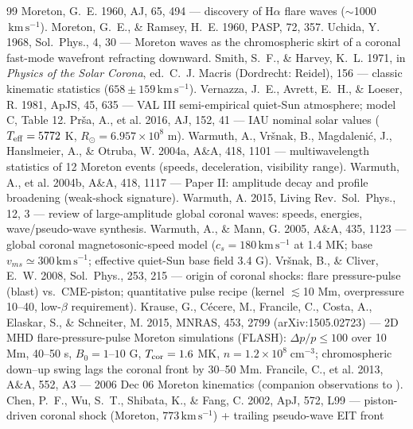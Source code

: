 \documentclass[11pt,a4paper]{article}
\newcommand{\Rsun}{R_\odot}
\newcommand{\kms}{\,\mathrm{km\,s^{-1}}}
\begin{document}
\begin{thebibliography}{99}\itemsep1pt\small
{} Moreton, G.~E. 1960, AJ, 65, 494 --- discovery of H$\alpha$ flare
waves ($\sim$1000$\kms$).
 Moreton, G.~E., \& Ramsey, H.~E. 1960, PASP, 72, 357.
 Uchida, Y. 1968, Sol.~Phys., 4, 30 --- Moreton waves as the
chromospheric skirt of a coronal fast-mode wavefront refracting downward.
 Smith, S.~F., \& Harvey, K.~L. 1971, in \emph{Physics of the
Solar Corona}, ed.\ C.~J. Macris (Dordrecht: Reidel), 156 --- classic kinematic
statistics ($658\pm159\kms$).
 Vernazza, J.~E., Avrett, E.~H., \& Loeser, R. 1981, ApJS, 45, 635 ---
VAL III semi-empirical quiet-Sun atmosphere; model C, Table 12.
 Pr\v{s}a, A., et al. 2016, AJ, 152, 41 --- IAU nominal solar values
($T_{\rm eff}=5772$ K, $\Rsun=6.957\times10^8$ m).
 Warmuth, A., Vr\v{s}nak, B., Magdaleni\'c, J., Hanslmeier, A., \&
Otruba, W. 2004a, A\&A, 418, 1101 --- multiwavelength statistics of 12 Moreton events
(speeds, deceleration, visibility range).
 Warmuth, A., et al. 2004b, A\&A, 418, 1117 --- Paper II:
amplitude decay and profile broadening (weak-shock signature).
 Warmuth, A. 2015, Living Rev.~Sol.~Phys., 12, 3 --- review of
large-amplitude global coronal waves: speeds, energies, wave/pseudo-wave synthesis.
 Warmuth, A., \& Mann, G. 2005, A\&A, 435, 1123 --- global
coronal magnetosonic-speed model ($c_s=180\kms$ at 1.4 MK; base $v_{ms}\simeq300\kms$;
effective quiet-Sun base field 3.4 G).
 Vr\v{s}nak, B., \& Cliver, E.~W. 2008, Sol.~Phys., 253, 215 ---
origin of coronal shocks: flare pressure-pulse (blast) vs.\ CME-piston; quantitative
pulse recipe (kernel $\lesssim$10 Mm, overpressure 10--40, low-$\beta$ requirement).
 Krause, G., C\'ecere, M., Francile, C., Costa, A., Elaskar, S., \&
Schneiter, M. 2015, MNRAS, 453, 2799 (arXiv:1505.02723) --- 2D MHD flare-pressure-pulse
Moreton simulations (FLASH): $\Delta p/p\le100$ over 10 Mm, 40--50 s, $B_0=1$--$10$ G,
$T_{\rm cor}=1.6$ MK, $n=1.2\times10^8\;\mathrm{cm^{-3}}$; chromospheric down--up swing
lags the coronal front by 30--50 Mm.
 Francile, C., et al. 2013, A\&A, 552, A3 --- 2006 Dec 06 Moreton
kinematics (companion observations to \cite{Krause2015}).
 Chen, P.~F., Wu, S.~T., Shibata, K., \& Fang, C. 2002, ApJ, 572, L99 ---
piston-driven coronal shock (Moreton, $773\kms$) + trailing pseudo-wave EIT front

\end{thebibliography}
\end{document}
